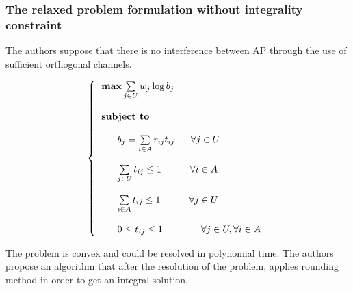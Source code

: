 \documentclass[journal,transmag]{IEEEtran}
\begin{document}
\subsubsection{The relaxed problem formulation without integrality constraint}
The authors suppose that there is no interference between AP through the use of sufficient orthogonal channels.
\begin{footnotesize}
\begin{equation}
\left\{
\begin{tabular}{l}
$\textbf{max}  \sum\limits_{j \in U} w_j \log b_j $ \\         
\\
\textbf{subject to} \\

\\
~~~~~$ b_j = \sum\limits_{i \in A} r_{ij} t_{ij}$ ~~~ $\forall j \in U $  \\

\\
~~~~~$ \sum\limits_{j \in U} t_{ij} \leq 1 ~~~~~~~~~ \forall i \in A $ \\ 

\\
~~~~~$ \sum\limits_{i \in A} t_{ij} \leq 1 ~~~~~~~~~ \forall j \in U $ \\ 


\\
~~~~~$ 0\leq t_{ij} \leq 1   ~~~~~~~~~~~~ \forall j \in U, \forall i \in A  $ \\

\end{tabular}
\right.
\end{equation}
\end{footnotesize}  

The problem is convex and could be resolved in polynomial time. The authors propose an algorithm that after the resolution of the problem, applies rounding method in order to get an integral solution. 
\end{document}
